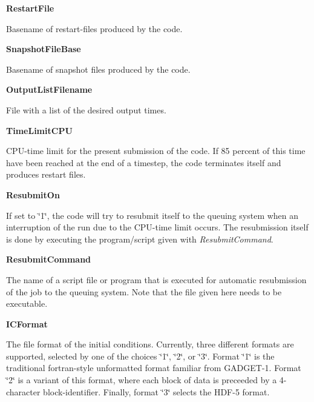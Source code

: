 \begin{DoxyItemize}
\item {\bfseries \-Restart\-File} \par
 \-Basename of restart-\/files produced by the code.
\end{DoxyItemize}


\begin{DoxyItemize}
\item {\bfseries \-Snapshot\-File\-Base} \par
 \-Basename of snapshot files produced by the code.
\end{DoxyItemize}


\begin{DoxyItemize}
\item {\bfseries \-Output\-List\-Filename} \par
 \-File with a list of the desired output times.
\end{DoxyItemize}


\begin{DoxyItemize}
\item {\bfseries \-Time\-Limit\-C\-P\-U} \par
 \-C\-P\-U-\/time limit for the present submission of the code. \-If 85 percent of this time have been reached at the end of a timestep, the code terminates itself and produces restart files.
\end{DoxyItemize}


\begin{DoxyItemize}
\item {\bfseries \-Resubmit\-On} \par
 \-If set to \char`\"{}1\char`\"{}, the code will try to resubmit itself to the queuing system when an interruption of the run due to the \-C\-P\-U-\/time limit occurs. \-The resubmission itself is done by executing the program/script given with {\itshape \-Resubmit\-Command\/}.
\end{DoxyItemize}


\begin{DoxyItemize}
\item {\bfseries \-Resubmit\-Command} \par
 \-The name of a script file or program that is executed for automatic resubmission of the job to the queuing system. \-Note that the file given here needs to be executable.
\end{DoxyItemize}


\begin{DoxyItemize}
\item {\bfseries \-I\-C\-Format} \par
 \-The file format of the initial conditions. \-Currently, three different formats are supported, selected by one of the choices \char`\"{}1\char`\"{}, \char`\"{}2\char`\"{}, or \char`\"{}3\char`\"{}. \-Format \char`\"{}1\char`\"{} is the traditional fortran-\/style unformatted format familiar from \-G\-A\-D\-G\-E\-T-\/1. \-Format \char`\"{}2\char`\"{} is a variant of this format, where each block of data is preceeded by a 4-\/character block-\/identifier. \-Finally, format \char`\"{}3\char`\"{} selects the \-H\-D\-F-\/5 format.
\end{DoxyItemize}


